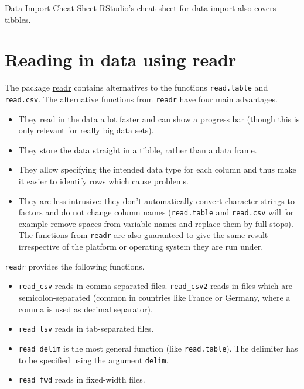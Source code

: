 \documentclass[
]{book}
\providecommand{\tightlist}{%
  \setlength{\itemsep}{0pt}\setlength{\parskip}{0pt}}
\begin{document}
\href{\%22https://github.com/rstudio/cheatsheets/raw/main/data-import.pdf\%22}{Data Import Cheat Sheet}
RStudio's cheat sheet for data import also covers tibbles.

\hypertarget{reading-in-data-using-readr}{%
\section{Reading in data using readr}\label{reading-in-data-using-readr}}

The package \href{https://cran.r-project.org/web/packages/readr/index.html}{readr} contains alternatives to the functions \texttt{read.table} and \texttt{read.csv}. The alternative functions from \texttt{readr} have four main advantages.

\begin{itemize}
\tightlist
\item
  They read in the data a lot faster and can show a progress bar (though this is only relevant for really big data sets).
\item
  They store the data straight in a tibble, rather than a data frame.
\item
  They allow specifying the intended data type for each column and thus make it easier to identify rows which cause problems.
\item
  They are less intrusive: they don't automatically convert character strings to factors and do not change column names (\texttt{read.table} and \texttt{read.csv} will for example remove spaces from variable names and replace them by full stops). The functions from \texttt{readr} are also guaranteed to give the same result irrespective of the platform or operating system they are run under.
\end{itemize}

\texttt{readr} provides the following functions.

\begin{itemize}
\tightlist
\item
  \texttt{read\_csv} reads in comma-separated files. \texttt{read\_csv2} reads in files which are semicolon-separated (common in countries like France or Germany, where a comma is used as decimal separator).
\item
  \texttt{read\_tsv} reads in tab-separated files.
\item
  \texttt{read\_delim} is the most general function (like \texttt{read.table}). The delimiter has to be specified using the argument \texttt{delim}.
\item
  \texttt{read\_fwd} reads in fixed-width files.
\end{itemize}
\end{document}
